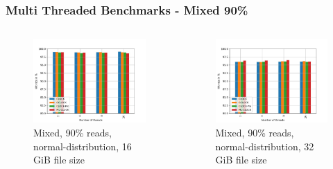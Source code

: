 \documentclass[
	aspectratio=169,
	compress,
]{beamer}
\newcommand{\navframetitle}[1]{\frametitle{#1\hfill{\footnotesize\lastsection{}}}}
\begin{document}
\begin{frame}[fragile]
	\navframetitle{Multi Threaded Benchmarks - Mixed 90\%}

	\begin{columns}
		\begin{column}{0.5\textwidth}
			\begin{figure}[ht]
    			\centering
    			\includegraphics[width=\textwidth]{multi_16_gb_rw_90to10_normal.jpg}
        		\caption{Mixed, 90\% reads, normal-distribution, 16 GiB file size}
			\end{figure}
		\end{column}
		\begin{column}{0.5\textwidth}
			\begin{figure}[ht]
    			\centering
    			\includegraphics[width=\textwidth]{multi_32_gb_rw_90to10_normal.jpg}
        		\caption{Mixed, 90\% reads, normal-distribution, 32 GiB file size}
			\end{figure}			
		\end{column}
	\end{columns}
\end{frame}
\end{document}
